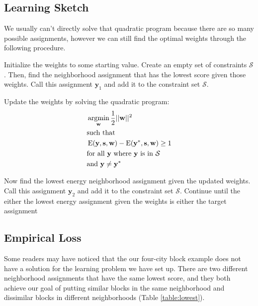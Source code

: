 \subsection*{Learning Sketch}
We usually can't directly solve that quadratic program because there
are so many possible assignments, however we can still find the
optimal weights through the following procedure.

Initialize the weights to some starting value. Create an empty set of
constraints $\mathcal{S}$. Then, find the neighborhood assignment that
has the lowest score given those weights. Call this assignment
$\mathbf{y}_1$ and add it to the constraint set $\mathcal{S}$.

Update the weights by solving the quadratic program: 
%
\begin{align*}
&\operatorname*{\arg\!\min}_{\mathbf{w}} \frac{1}{2}||\mathbf{w}||^2 \\
&\text{such that} \\
&\operatorname{E}(\mathbf{y}, \mathbf{s}, \mathbf{w})
- \operatorname{E}(\mathbf{y}^*, \mathbf{s}, \mathbf{w}) \geq 1 \\ 
&\text{for all } \mathbf{y} \text{ where } \mathbf{y} \text{ is in } \mathcal{S}\\
&\text{and } \mathbf{y} \neq \mathbf{y}^*
\end{align*}
%

Now find the lowest energy neighborhood assignment given the updated
weights. Call this assignment $\mathbf{y}_2$ and add it to the
constraint set $\mathcal{S}$. Continue until the either the lowest
energy assignment given the weights is either the target
assignment\cite{szummer_learning_2008}


\subsection*{Empirical Loss}
Some readers may have noticed that the our four-city block example
does not have a solution for the learning problem we have set up. There
are two different neighborhood assignments that have the same lowest
score, and they both achieve our goal of putting similar blocks in the 
same neighborhood and dissimilar blocks in different neighborhoods (Table \ref{table:lowest}).

